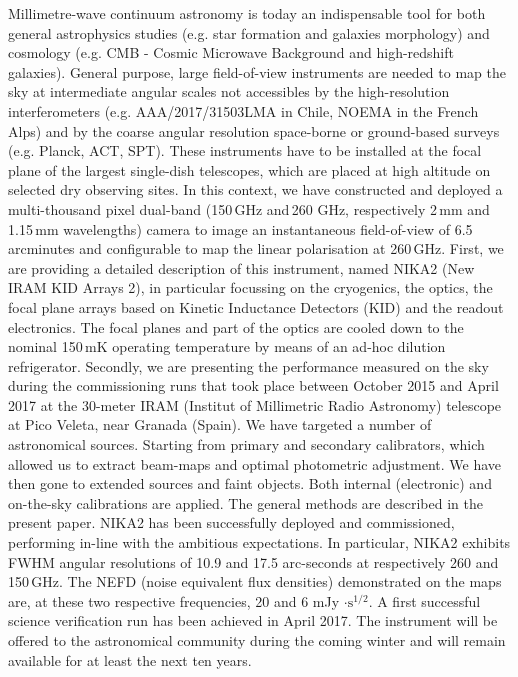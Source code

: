 \documentclass[]{aa} %
\begin{document}
  \abstract
   {Millimetre-wave continuum astronomy is today an indispensable tool for both general astrophysics studies (e.g. star formation and galaxies morphology) and cosmology (e.g. CMB - Cosmic Microwave Background and high-redshift galaxies). General purpose, large field-of-view instruments are needed to map the sky at intermediate angular scales not accessibles by the high-resolution interferometers (e.g. AAA/2017/31503LMA in Chile, NOEMA in the French Alps) and by the coarse angular resolution space-borne or ground-based surveys (e.g. Planck, ACT, SPT). These instruments have to be installed at the focal plane of the largest single-dish telescopes, which are placed at high altitude on selected dry observing sites. In this context, we have constructed and deployed a multi-thousand pixel dual-band (150\,GHz and\,260 GHz, respectively 2\,mm and 1.15\,mm wavelengths) camera to image an instantaneous field-of-view of 6.5\,arcminutes and configurable to map the linear polarisation at 260\,GHz.}
   {First, we are providing a detailed description of this instrument, named NIKA2 (New IRAM KID Arrays 2), in particular focussing on the cryogenics, the optics, the focal plane arrays based on Kinetic Inductance Detectors (KID) and the readout electronics. The focal planes and part of the optics are cooled down to the nominal 150\,mK operating temperature by means of an ad-hoc dilution refrigerator. 
Secondly, we are presenting the performance measured on the sky during the commissioning runs that took place between October 2015 and April 2017 at the 30-meter IRAM (Institut of Millimetric Radio Astronomy) telescope at Pico Veleta, near Granada (Spain).}
   {We have targeted a number of astronomical sources. Starting from primary and secondary calibrators, which allowed us to extract beam-maps and optimal photometric adjustment. We have then gone to extended sources and faint objects. Both internal (electronic) and on-the-sky calibrations are applied. The general methods are described in the present paper.}
   {NIKA2 has been successfully deployed and commissioned, performing in-line with the ambitious expectations. In particular, NIKA2 exhibits FWHM angular resolutions of 10.9 and 17.5 arc-seconds at respectively 260 and 150\,GHz. The NEFD (noise equivalent flux densities) demonstrated on the maps are, at these two respective frequencies, 20 and 6 mJy $\cdot\textrm{s}^{1/2}$. A first successful science verification run has been achieved in April 2017. The instrument will be offered to the astronomical community during the coming winter and will remain available for at least the next ten years.}
  {}
\end{document}
